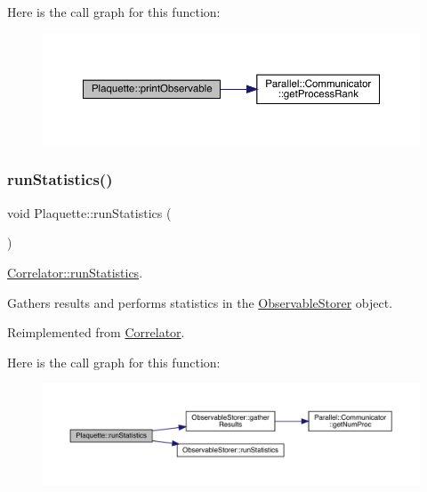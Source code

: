 Here is the call graph for this function\+:
\nopagebreak
\begin{figure}[H]
\begin{center}
\leavevmode
\includegraphics[width=350pt]{class_plaquette_aa15bf42749c9fd995d4d572ca3ed4f22_cgraph}
\end{center}
\end{figure}
\mbox{\label{class_plaquette_aa54bf1807d9b192048026f94d585fa4f}} 
\subsubsection{\texorpdfstring{runStatistics()}{runStatistics()}}
{\footnotesize\ttfamily void Plaquette\+::run\+Statistics (\begin{DoxyParamCaption}{ }\end{DoxyParamCaption})\hspace{0.3cm}{\ttfamily [virtual]}}



\mbox{\hyperlink{class_correlator_a35197b1d12b62ef30b79c0138a26456e}{Correlator\+::run\+Statistics}}. 

Gathers results and performs statistics in the \mbox{\hyperlink{class_observable_storer}{Observable\+Storer}} object. 

Reimplemented from \mbox{\hyperlink{class_correlator_a35197b1d12b62ef30b79c0138a26456e}{Correlator}}.

Here is the call graph for this function\+:
\nopagebreak
\begin{figure}[H]
\begin{center}
\leavevmode
\includegraphics[width=350pt]{class_plaquette_aa54bf1807d9b192048026f94d585fa4f_cgraph}
\end{center}
\end{figure}
\mbox{\label{class_plaquette_a011e1ca450fb40273ec8efa6d094c279}} 
